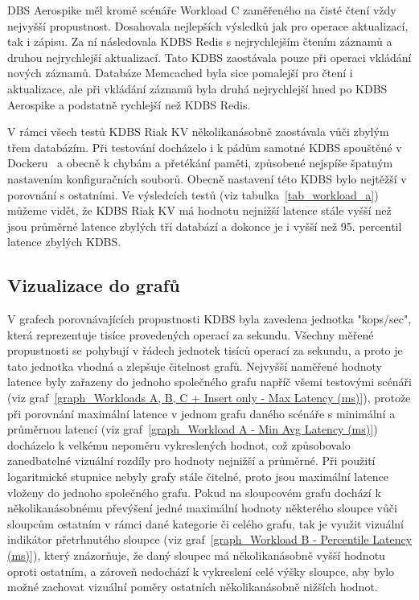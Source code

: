\documentclass[czech,master,dept460,male,csharp,cpdeclaration]{diploma}
\begin{document}
	DBS Aerospike měl kromě scénáře Workload C zaměřeného na čisté čtení vždy nejvyšší propustnost. Dosahovala nejlepších výsledků jak pro operace aktualizací, tak i zápisu. Za ní následovala KDBS Redis s nejrychlejším čtením záznamů a druhou nejrychlejší aktualizací. Tato KDBS zaostávala pouze při operaci vkládání nových záznamů. Databáze Memcached byla sice pomalejší pro čtení i aktualizace, ale při vkládání záznamů byla druhá nejrychlejší hned po KDBS Aerospike a podstatně rychlejší než KDBS Redis.
	
	V rámci všech testů KDBS Riak KV několikanásobně zaostávala vůči zbylým třem databázím. Při testování docházelo i k pádům samotné KDBS spouštěné v Dockeru~\cite{docker} a obecně k chybám a přetékání paměti, způsobené nejspíše špatným nastavením konfiguračních souborů. Obecně nastavení této KDBS bylo nejtěžší v porovnání s ostatními. Ve výsledcích testů (viz tabulka~\ref{tab_workload_a}) můžeme vidět, že KDBS Riak KV má hodnotu nejnižší latence stále vyšší než jsou průměrné latence zbylých tří databází a dokonce je i vyšší než 95. percentil latence zbylých KDBS.
	
	\subsection{Vizualizace do grafů}
	
	V grafech porovnávajících propustnosti KDBS byla zavedena jednotka "kops/sec", která reprezentuje tisíce provedených operací za sekundu. Všechny měřené propustnosti se pohybují v řádech jednotek tisíců operací za sekundu, a proto je tato jednotka vhodná a zlepšuje čitelnost grafů. Nejvyšší naměřené hodnoty latence byly zařazeny do jednoho společného grafu napříč všemi testovými scénáři (viz graf~\ref{graph_Workloads A, B, C + Insert only - Max Latency (ms)}), protože při porovnání maximální latence v jednom grafu daného scénáře s minimální a průměrnou latencí (viz graf~\ref{graph_Workload A - Min Avg Latency (ms)}) docházelo k velkému nepoměru vykreslených hodnot, což způsobovalo zanedbatelné vizuální rozdíly pro hodnoty nejnižší a průměrné. Při použití logaritmické stupnice nebyly grafy stále čitelné, proto jsou maximální latence vloženy do jednoho společného grafu. Pokud na sloupcovém grafu dochází k několikanásobnému převýšení jedné maximální hodnoty některého sloupce vůči sloupcům ostatním v rámci dané kategorie či celého grafu, tak je využit vizuální indikátor přetrhnutého sloupce (viz graf~\ref{graph_Workload B - Percentile Latency (ms)}), který znázorňuje, že daný sloupec má několikanásobně vyšší hodnotu oproti ostatním, a zároveň nedochází k vykreslení celé výšky sloupce, aby bylo možné zachovat vizuální poměry ostatních několikanásobně nižších hodnot.
	
\end{document}
